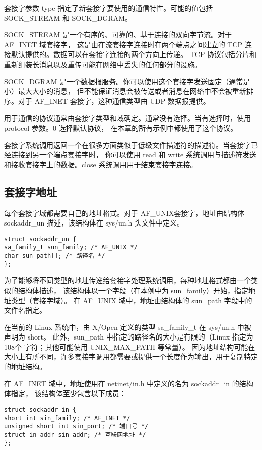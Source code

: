 \documentclass{ctexart}
\begin{document}
套接字参数 type 指定了新套接字要使用的通信特性。可能的值包括 SOCK\_STREAM 和 SOCK\_DGRAM。  
  
SOCK\_STREAM 是一个有序的、可靠的、基于连接的双向字节流。对于 AF\_INET 域套接字，
这是由在流套接字连接时在两个端点之间建立的 TCP 连接默认提供的。数据可以在套接字连接的两个方向上传递。
TCP 协议包括分片和重新组装长消息以及重传可能在网络中丢失的任何部分的设施。  
  
SOCK\_DGRAM 是一个数据报服务。你可以使用这个套接字发送固定（通常是小）最大大小的消息，
但不能保证消息会被传送或者消息在网络中不会被重新排序。对于 AF\_INET 套接字，这种通信类型由 UDP 数据报提供。  
  
用于通信的协议通常由套接字类型和域确定。通常没有选择。当有选择时，使用 protocol 参数。0 选择默认协议，
在本章的所有示例中都使用了这个协议。  
  
套接字系统调用返回一个在很多方面类似于低级文件描述符的描述符。当套接字已经连接到另一个端点套接字时，
你可以使用 read 和 write 系统调用与描述符发送和接收套接字上的数据。close 系统调用用于结束套接字连接。  

\subsection{套接字地址}  
每个套接字域都需要自己的地址格式。对于 AF\_UNIX套接字，地址由结构体 sockaddr\_un 描述，该结构体在 sys/un.h 头文件中定义。  
\begin{verbatim}  
struct sockaddr_un {  
sa_family_t sun_family; /* AF_UNIX */  
char sun_path[]; /* 路径名 */  
};  
\end{verbatim}  
为了能够将不同类型的地址传递给套接字处理系统调用，每种地址格式都由一个类似的结构体描述，
该结构体以一个字段（在本例中为 sun\_family）开始，指定地址类型（套接字域）。
在 AF\_UNIX 域中，地址由结构体的 sun\_path 字段中的文件名指定。  
  
在当前的 Linux 系统中，由 X/Open 定义的类型 sa\_family\_t 在 sys/un.h 中被声明为 short。
此外，sun\_path 中指定的路径名的大小是有限的（Linux 指定为 108个 字符；其他可能使用 UNIX\_MAX\_PATH 等常量）。
因为地址结构可能在大小上有所不同，许多套接字调用都需要或提供一个长度作为输出，用于复制特定的地址结构。  
  
在 AF\_INET 域中，地址使用在 netinet/in.h 中定义的名为 
sockaddr\_in 的结构体指定，
该结构体至少包含以下成员：  
\begin{verbatim}  
struct sockaddr_in {  
short int sin_family; /* AF_INET */  
unsigned short int sin_port; /* 端口号 */  
struct in_addr sin_addr; /* 互联网地址 */  
};  
\end{verbatim}  
\end{document}
